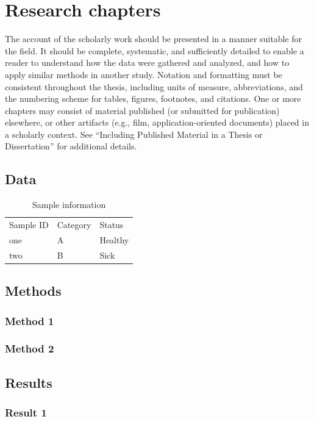 \section{Research chapters}

The account of the scholarly work should be presented in a manner suitable for the field. It should be complete, systematic, and sufficiently detailed to enable a reader to understand how the data were gathered and analyzed, and how to apply similar methods in another study. Notation and formatting must be consistent throughout the thesis, including units of measure, abbreviations, and the numbering scheme for tables, figures, footnotes, and citations. One or more chapters may consist of material published (or submitted for publication) elsewhere, or other artifacts (e.g., film, application-oriented documents) placed in a scholarly context. See “Including Published Material in a Thesis or Dissertation” for additional details.

\subsection{Data}

\begin{table}[H]
\caption{Sample information}
\label{table:sampleinfo}
\vspace{-.5em}
\begin{tabularx}{\textwidth}{@{}YYY@{}}
Sample ID & Category & Status \\
one & A & Healthy \\
two & B & Sick \\
\end{tabularx}
\end{table}

\subsection{Methods}
\subsubsection{Method 1}
\subsubsection{Method 2}
\subsection{Results}
\subsubsection{Result 1}

